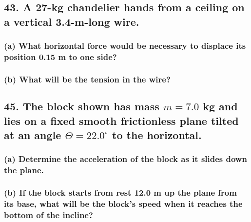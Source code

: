 \documentclass[12pt,a4paper,english]{article}
\begin{document}
\begin{flushleft}
  \subsection{43. A 27-kg chandelier hands from a ceiling on a vertical 3.4-m-long wire.}
  \subsubsection{(a) What horizontal force would be necessary to displace its position 0.15 m to one side?}
  \subsubsection{(b) What will be the tension in the wire?}
  \subsection{45. The block shown has mass $m=7.0$ kg and lies on a fixed smooth frictionless plane tilted at an angle $\Theta=22.0^\circ$ to the horizontal.}
  \subsubsection{(a) Determine the acceleration of the block as it slides down the plane.}
  \subsubsection{(b) If the block starts from rest 12.0 m up the plane from its base, what will be the block's speed when it reaches the bottom of the incline?}
\end{flushleft}
\end{document}
